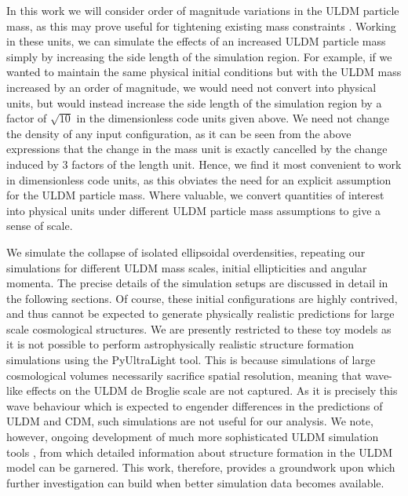 \documentclass[a4paper,11pt]{article}
\begin{document}
In this work we will consider order of magnitude variations in the ULDM particle mass, as this may prove useful for tightening existing mass constraints \cite{Marsh:2018zyw, Armengaud:2017nkf, Irsic:2017yje}.
Working in these units, we can simulate the effects of an increased ULDM particle mass simply by increasing the side length of the simulation region. For example, if we wanted to maintain the same physical initial conditions but with the ULDM mass increased by an order of magnitude, we would need not convert into physical units, but would instead increase the side length of the simulation region by a factor of $\sqrt{10}$ in the dimensionless code units given above. We need not change the density of any input configuration, as it can be seen from the above expressions that the change in the mass unit is exactly cancelled by the change induced by 3 factors of the length unit. Hence, we find it most convenient to work in dimensionless code units, as this obviates the need for an explicit assumption for the ULDM particle mass. Where valuable, we convert quantities of interest into physical units under different ULDM particle mass assumptions to give a sense of scale.

We simulate the collapse of isolated ellipsoidal overdensities, repeating our simulations for different ULDM mass scales, initial ellipticities and angular momenta. The precise details of the simulation setups are discussed in detail in the following sections. Of course, these initial configurations are highly contrived, and thus cannot be expected to generate physically realistic predictions for large scale cosmological structures. We are presently restricted to these toy models as it is not possible to perform astrophysically realistic structure formation simulations using the {\sc PyUltraLight} tool. This is because simulations of large cosmological volumes necessarily sacrifice spatial resolution, meaning that wave-like effects on the ULDM de Broglie scale are not captured. As it is precisely this wave behaviour which is expected to engender differences in the predictions of ULDM and CDM, such simulations are not useful for our analysis. We note, however, ongoing development of much more sophisticated ULDM simulation tools \cite{Mocz:2019emo, Niemeyer:2019aqm, Veltmaat:2019hou}, from which detailed information about structure formation in the ULDM model can be garnered. This work, therefore, provides a groundwork upon which further investigation can build when better simulation data becomes available.
\end{document}
